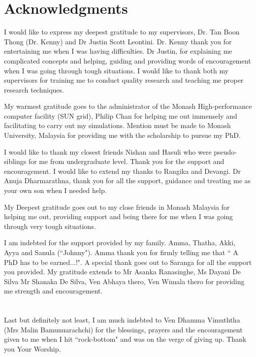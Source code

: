 \chapter*{Acknowledgments}

I would like to express my deepest gratitude to my supervisors, Dr. Tan Boon Thong (Dr. Kenny) and Dr Justin Scott Leontini. Dr. Kenny thank you for entertaining me when I was having difficulties. Dr Justin, for explaining me complicated concepts and helping, guiding and providing words of encouragement when I was going through tough situations. I would like to thank both my supervisors for training me to conduct quality research and teaching me proper research techniques.

My warmest gratitude goes to the administrator of the Monash High-performance computer facility (SUN grid), Philip Chan for helping me out immensely and facilitating to carry out my simulations. Mention must be made to Monash University, Malaysia for providing me with the scholarship to pursue my PhD. 
 
I would like to thank my closest friends Nishan and Hasuli who were pseudo-siblings for me from undergraduate level. Thank you for the support and encouragement. I would like to extend my thanks to Rangika and Devangi. Dr Anuja Dharmarathna, thank you for all the support, guidance and treating me as your own son when I needed help.

My Deepest gratitude goes out to my close friends in Monash Malaysia for helping me out, providing support and being there for me when I was going through very tough situations. 

I am indebted for the support provided by my family. Amma, Thatha, Akki, Ayya and Sanula (``Johnny"). Amma thank you for firmly telling me that `` A PhD has to be earned...!". A special thank goes out to Saranga for all the support you provided. My gratitude extends to Mr Asanka Ranasinghe, Ms Dayani De Silva Mr Shanaka De Silva, Ven Abhaya thero, Ven Wimala thero for providing me strength and encouragement.
\\
\\
\\
Last but definitely not least, I am much indebted to Ven Dhamma Vimuththa (Mrs Malin Bamunuarachchi) for the blessings, prayers and the encouragement given to me when I hit ``rock-bottom"  and was on the verge of giving up. Thank you Your Worship.    

 

  

  